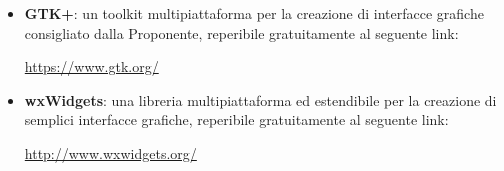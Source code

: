 \documentclass[./../Technology Baseline.tex]{subfiles}
\begin{document}
\begin{itemize}
	\item \textbf{GTK+}: un toolkit multipiattaforma per la creazione di interfacce grafiche consigliato dalla Proponente, reperibile gratuitamente al seguente link:
	\begin{center}
		\url{https://www.gtk.org/}
	\end{center}
	
	\item \textbf{wxWidgets}: una libreria multipiattaforma ed estendibile per la creazione di semplici interfacce grafiche, reperibile gratuitamente al seguente link:
	\begin{center}
		\url{http://www.wxwidgets.org/}
	\end{center}
\end{itemize} 
\end{document}
